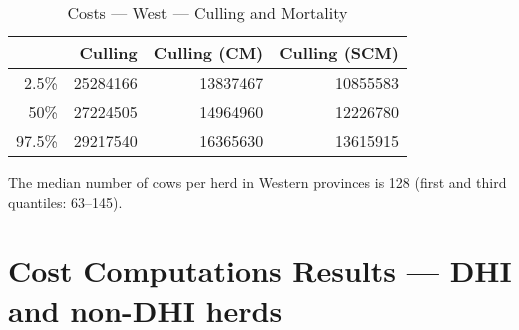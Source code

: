 \documentclass{article}\usepackage[]{graphicx}\usepackage[]{color}
\begin{document}
\begin{table}[ht]
\centering
\begin{tabular}{rrrr}
  \hline
 & Culling & Culling (CM) & Culling (SCM) \\ 
  \hline
2.5\% & 25284166 & 13837467 & 10855583 \\ 
  50\% & 27224505 & 14964960 & 12226780 \\ 
  97.5\% & 29217540 & 16365630 & 13615915 \\ 
   \hline
\end{tabular}
\caption{Costs --- West --- Culling and Mortality} 
\label{tab:west:c}
\end{table}


The median number of cows per herd in Western provinces is
128 (first and third quantiles:
63--145).
\clearpage

\section{Cost Computations Results --- DHI and non-DHI herds}
\end{document}
